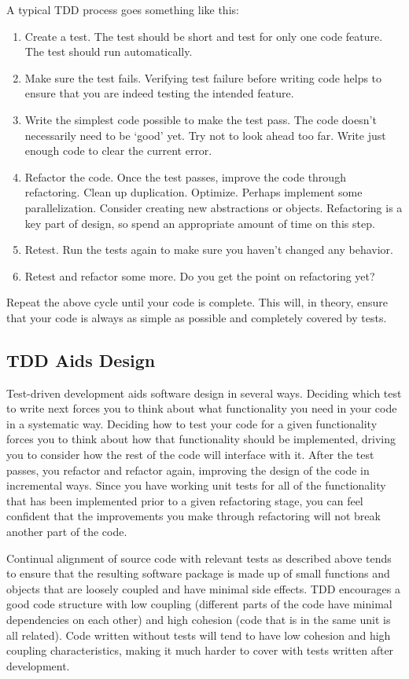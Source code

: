 A typical TDD process goes something like this:
\begin{enumerate}
\item Create a test. The test should be short and test for only one code feature. The test
  should run automatically.
\item Make sure the test fails. Verifying test failure before writing code helps to ensure
  that you are indeed testing the intended feature.
\item Write the simplest code possible to make the test pass. The code doesn't necessarily 
  need to be `good' yet.  Try not to look ahead too far. Write just enough code to clear 
  the current error.
\item Refactor the code. Once the test passes, improve the code through refactoring. 
  Clean up duplication. Optimize. Perhaps implement some parallelization. Consider creating new abstractions or
  objects.  Refactoring is a key part of design, so spend an appropriate amount of time on this step.
\item Retest. Run the tests again to make sure you haven't changed any behavior.
\item Retest and refactor some more. Do you get the point on refactoring yet?
\end{enumerate}

Repeat the above cycle until your code is complete. This will, in theory, ensure that your code is
always as simple as possible and completely covered by tests. 

\subsection{TDD Aids Design}
Test-driven development aids software design in several ways. Deciding which test to write next forces you
to think about what functionality you need in your code in a systematic way. Deciding how to test your code for
a given functionality forces you to think about how that functionality should be implemented, driving you to 
consider how the rest of the code will interface with it. After the test passes, you refactor and refactor again,
improving the design of the code in incremental ways. Since you have working unit tests for all of the functionality
that has been implemented prior to a given refactoring stage, you can feel confident that the improvements you make
through refactoring will not break another part of the code.

Continual alignment of source code with relevant tests as described above tends to ensure that the resulting 
software package is made up of small functions and objects that are loosely coupled and have minimal side effects.
TDD encourages a good code structure with low coupling (different parts of the code have minimal dependencies
on each other) and high cohesion (code that is in the same unit is all related). Code written without tests will
tend to have low cohesion and high coupling characteristics, making it much harder to cover with tests
written after development.

